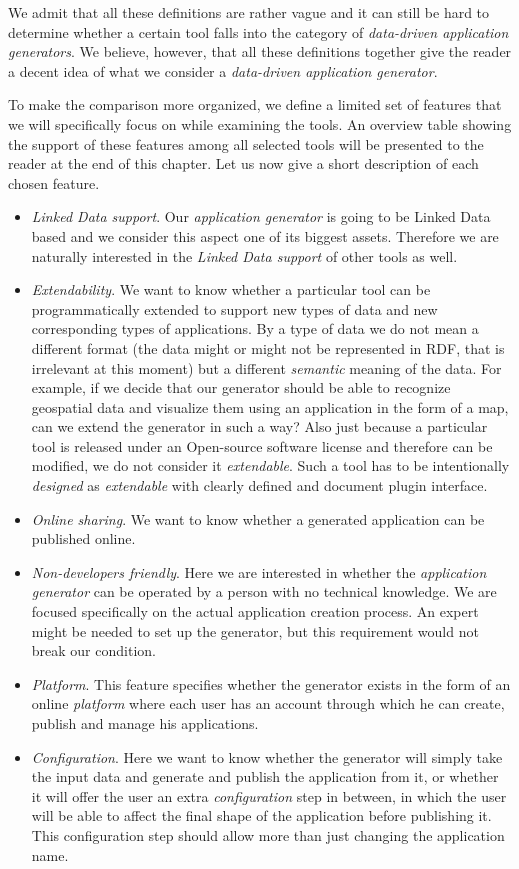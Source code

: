 We admit that all these definitions are rather vague and it can still be hard to determine whether a certain tool falls into the category of \emph{data-driven application generators}. We believe, however, that all these definitions together give the reader a decent idea of what we consider a \emph{data-driven application generator}.

To make the comparison more organized, we define a limited set of features that we will specifically focus on while examining the tools. An overview table showing the support of these features among all selected tools will be presented to the reader at the end of this chapter. Let us now give a short description of each chosen feature.

\begin{itemize}
\item \emph{Linked Data support}. Our \emph{application generator} is going to be Linked Data based and we consider this aspect one of its biggest assets. Therefore we are naturally interested in the \emph{Linked Data support} of other tools as well.
\item \emph{Extendability}. We want to know whether a particular tool can be programmatically extended to support new types of data and new corresponding types of applications. By a type of data we do not mean a different format (the data might or might not be represented in RDF, that is irrelevant at this moment) but a different \emph{semantic} meaning of the data. For example, if we decide that our generator should be able to recognize geospatial data and visualize them using an application in the form of a map, can we extend the generator in such a way? Also just because a particular tool is released under an Open-source software license and therefore can be modified, we do not consider it \emph{extendable}. Such a tool has to be intentionally \emph{designed} as \emph{extendable} with clearly defined and document plugin interface.
\item \emph{Online sharing}. We want to know whether a generated application can be published online.
\item \emph{Non-developers friendly}. Here we are interested in whether the \emph{application generator} can be operated by a person with no technical knowledge. We are focused specifically on the actual application creation process. An expert might be needed to set up the generator, but this requirement would not break our condition.
\item \emph{Platform}. This feature specifies whether the generator exists in the form of an online \emph{platform} where each user has an account through which he can create, publish and manage his applications.
\item \emph{Configuration}. Here we want to know whether the generator will simply take the input data and generate and publish the application from it, or whether it will offer the user an extra \emph{configuration} step in between, in which the user will be able to affect the final shape of the application before publishing it. This configuration step should allow more than just changing the application name.
\end{itemize}


